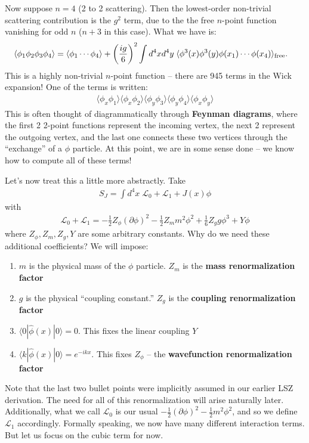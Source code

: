 \documentclass{../mathnotes}
\begin{document}
Now suppose $n=4$ (2 to 2 scattering). Then the lowest-order non-trivial scattering contribution is the $g^2$ term, due to the 
the free $n$-point function vanishing for odd $n$ ($n+3$ in this case). What we have is:
\begin{align*}
    \langle \phi_1\phi_2\phi_3\phi_4\rangle&=\langle\phi_1\cdots\phi_4\rangle+\left( \frac{ig}{6} \right)^2\int d^4x d^4y\;\langle \phi^3(x)\phi^3(y)\phi(x_1)\cdots\phi(x_4)\rangle_{\rm free}.
\end{align*}
This is a highly non-trivial $n$-point function -- there are 945 terms in the Wick expansion!
One of the terms is written:
\begin{align*}
    \langle \phi_x\phi_1\rangle\langle\phi_x\phi_2\rangle\langle\phi_y\phi_3\rangle\langle \phi_y\phi_4\rangle\langle\phi_x\phi_y\rangle
\end{align*}
This is often thought of diagrammatically through \textbf{Feynman diagrams}, where the first 2 2-point functions represent the incoming vertex,
the next 2 represent the outgoing vertex, and the last one connects these two vertices through the ``exchange'' of a $\phi$ particle. At this point,
we are in some sense done -- we know how to compute all of these terms!

Let's now treat this a little more abstractly. Take
\begin{align*}
    S_J=\int d^4x\;\mathcal{L}_0+\mathcal{L}_1+J(x)\phi
\end{align*}
with
\begin{align*}
    \mathcal{L}_0+\mathcal{L}_1=-\frac{1}{2}Z_\phi\left( \partial\phi \right)^2-\frac{1}{2}Z_m m^2\phi^2+\frac{1}{6}Z_g g\phi^3 + Y\phi
\end{align*}
where $Z_\phi,Z_m,Z_g, Y$ are some arbitrary constants. Why do we need these additional coefficients? We will impose:
\begin{enumerate}
    \item $m$ is the physical mass of the $\phi$ particle. $Z_m$ is the \textbf{mass renormalization factor}
    \item $g$ is the physical ``coupling constant.'' $Z_g$ is the \textbf{coupling renormalization factor}
    \item $\langle 0|\hat{\phi}(x)|0\rangle=0$. This fixes the linear coupling $Y$
    \item $\langle k|\hat{\phi}(x)|0\rangle=e^{-ikx}$. This fixes $Z_\phi$ -- the \textbf{wavefunction renormalization factor}
\end{enumerate}
Note that the last two bullet points were implicitly assumed in our earlier LSZ derivation. The need for all of this renormalization will
arise naturally later. Additionally, what we call $\mathcal{L}_0$ is our usual $-\frac{1}{2}\left( \partial \phi \right)^2-\frac{1}{2}m^2\phi^2$,
and so we define $\mathcal{L}_1$ accordingly. Formally speaking, we now have many different interaction terms. But let us focus on the cubic term
for now.
\end{document}

